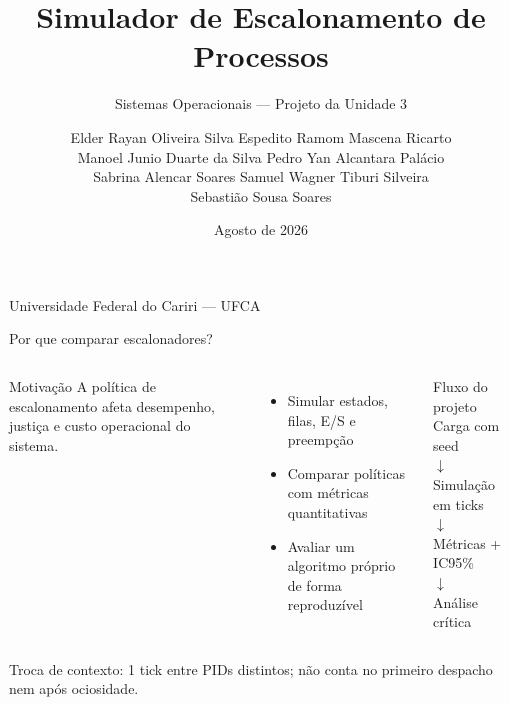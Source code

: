 \documentclass[aspectratio=169,11pt]{beamer}
\title[Simulador de Escalonamento]{Simulador de Escalonamento de Processos}
\subtitle{Sistemas Operacionais — Projeto da Unidade 3}
\author[Equipe]{Elder Rayan Oliveira Silva \quad Espedito Ramom Mascena Ricarto \\
Manoel Junio Duarte da Silva \quad Pedro Yan Alcantara Palácio \\
Sabrina Alencar Soares \quad Samuel Wagner Tiburi Silveira \\
Sebastião Sousa Soares}
\date{Agosto de 2026}
\begin{document}
\begin{frame}[plain]
  \titlepage
  \vfill
  \centering
  \small Universidade Federal do Cariri — UFCA
\end{frame}

\begin{frame}{Por que comparar escalonadores?}
  \begin{columns}[T,onlytextwidth]
      \begin{block}{Motivação}
        A política de escalonamento afeta desempenho, justiça e custo operacional do sistema.
      \end{block}
      \begin{itemize}
        \item Simular estados, filas, E/S e preempção
        \item Comparar políticas com métricas quantitativas
        \item Avaliar um algoritmo próprio de forma reproduzível
      \end{itemize}
      \begin{block}{Fluxo do projeto}
        \centering
        Carga com seed\\[.4em]
        $\downarrow$\\[.4em]
        Simulação em ticks\\[.4em]
        $\downarrow$\\[.4em]
        Métricas + IC95\%\\[.4em]
        $\downarrow$\\[.4em]
        Análise crítica
      \end{block}
  \end{columns}
  \vfill
  \scriptsize Troca de contexto: 1 tick entre PIDs distintos; não conta no primeiro despacho nem após ociosidade.
\end{frame}
\end{document}
